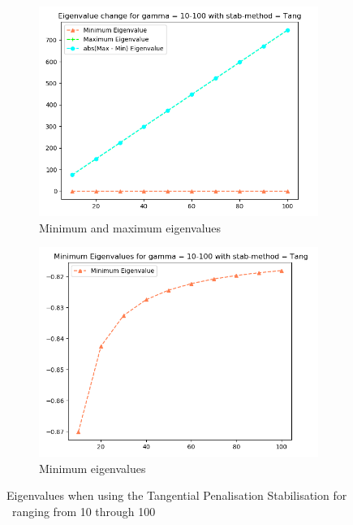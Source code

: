 \begin{figure}[ht]
     \centering
     \begin{subfigure}[h]{0.49\textwidth}
        \centering
\includegraphics[width=\textwidth]{latex/Thesis/media/Gamma_10_thru_100_tang.png}
\caption{Minimum and maximum eigenvalues\label{fig:TangEigHigh}}
     \end{subfigure}
     \hfill
     \begin{subfigure}[h]{0.49\textwidth}
\centering
\includegraphics[width=\textwidth]{latex/Thesis/media/Gamma_10_thru_100_tang_min.png}
\caption{Minimum eigenvalues\label{fig:TangEigHighMin}}
     \end{subfigure}
        \caption{Eigenvalues when using the Tangential Penalisation Stabilisation for \mgamma~ranging from 10 through 100}
        \label{fig:TangEigHighmulti}
\end{figure}